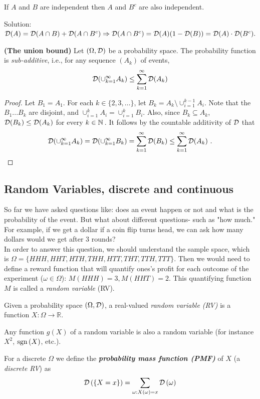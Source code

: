 \begin{exercise}
If $A$ and $B$ are independent then $A$ and $B^c$ are also independent.
\end{exercise}
Solution: $\mathcal{D}(A)=\mathcal{D}(A\cap B)+\mathcal{D}(A\cap B^c)\Rightarrow\mathcal{D}(A\cap B^c)=\mathcal{D}(A)(1-\mathcal{D}(B))=\mathcal{D}(A)\cdot\mathcal{D}(B^c).$\\


\begin{lemma}  \label{lem:unionBound}  \textbf{(The union bound)} Let
$(\Omega, \mathcal{D})$ be a probability space. The probability function is \emph{sub-additive}, i.e., for any sequence $(A_k)$ of events,
\[
\mathcal{D}(\cup_{k=1}^\infty A_k) \le \sum_{k=1} ^\infty \mathcal{D}(A_k)
\]
\end{lemma}
\begin{proof}
Let $B_1=A_1$. For each $k \in \{2,3,\ldots\}$, let $B_k = A_k
\setminus \cup_{i=1}^{k-1} A_i$. Note that the $B_1...B_k$ are disjoint, and
$\cup_{i=1}^k A_i=\cup_{i=1}^k B_i$. Also, since $B_k\subseteq A_k$, $\mathcal{D}(B_k) \le \mathcal{D}(A_k)$ for every $k \in \mathbb{N}\,$. It follows by the countable additivity of $\mathcal{D}$ that
\[
\mathcal{D}(\cup_{k=1}^\infty A_k) = \mathcal{D}(\cup_{k=1}^\infty B_k) = \sum_{k=1}
^\infty \mathcal{D}(B_k) \le \sum_{k=1}
^\infty \mathcal{D}(A_k)~.
\]
\end{proof}




\subsection{Random Variables, discrete and continuous}

So far we have asked questions like: does an event happen or not and what is the probability of the event. But what about different questions- such as  "how much." For example, if we get a dollar if a coin flip turns head, we can ask how many dollars would we get after 3 rounds? \\

In order to answer this question, we should understand the sample space, which is
 $\Omega=\{HHH,HHT,HTH,THH,HTT,THT,TTH,TTT\}$. Then we would need to define a reward function that will quantify ones's profit for each outcome of the experiment ($\omega\in \Omega$):
 $M(HHH)=3,M(HHT)=2.$ This quantifying function $M$ is called a \emph{random variable} (RV).
\begin{definition}
Given a probability space $\left(\Omega,\mathcal{D}\right)$, a real-valued \emph{random variable (RV)} is a function $X:\Omega\rightarrow\mathbb{R}$.

\end{definition}
\begin{remark}
Any function $g\left(X\right)$ of a random variable is also a random
variable (for instance $X^{2}$, ${\mathrm{sgn}} \left(X\right)$, etc.).
\end{remark}
For a discrete $\Omega$ we define the \textbf{\textit{probability
mass function (PMF)}} of $X$ (a \textit{discrete RV}) as
\[
\mathcal{D}\left(\left\{ X=x\right\} \right)=\sum_{\omega:X\left(\omega\right)=x}\mathcal{D}\left(\omega\right)
\]


